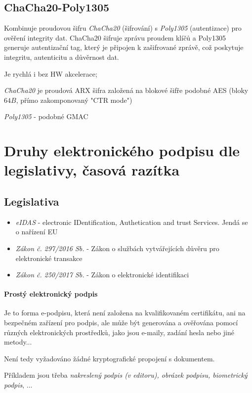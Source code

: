 \documentclass[10pt,a4paper]{article}
\begin{document}
\subsection{ChaCha20-Poly1305}

Kombinuje proudovou šifru \textit{ChaCha20} (šifrování) s \textit{Poly1305} (autentizace) pro ověření integrity dat. 
ChaCha20 šifruje zprávu proudem klíčů a Poly1305 generuje autentizační tag, který je připojen k zašifrované zprávě, což poskytuje integritu, autenticitu a důvěrnost dat.

Je rychlá i bez HW akcelerace;

\textit{ChaCha20} je proudová ARX šifra založená na blokové šifře podobné AES (bloky $64B$, přímo zakomponovaný "CTR mode")

\textit{Poly1305} - podobné GMAC

\section{Druhy elektronického podpisu dle legislativy, časová razítka}

\subsection{Legislativa}
\begin{itemize}
	\item \textit{eIDAS} - electronic IDentification, Authetication and trust Services. Jendá se o nařízení EU
	\item \textit{Zákon č. 297/2016 Sb.} - Zákon o službách vytvářejících důvěru pro elektronické transakce
	\item \textit{Zákon č. 250/2017 Sb.} - Zákon o elektronické identifikaci
\end{itemize}

\paragraph{Prostý elektronický podpis}

Je to forma e-podpisu, která není založena na kvalifikovaném certifikátu, ani na bezpečném zařízení pro podpis, ale může být generována a ověřována pomocí různých elektronických prostředků, jako jsou e-maily, zadání hesla nebo jiné metody...

Není tedy vyžadováno žádné kryptografické propojení s dokumentem. 

Příkladem jsou třeba \textit{nakreslený podpis (v editoru), obrázek podpisu, biometrický podpis}, ...
\end{document}
